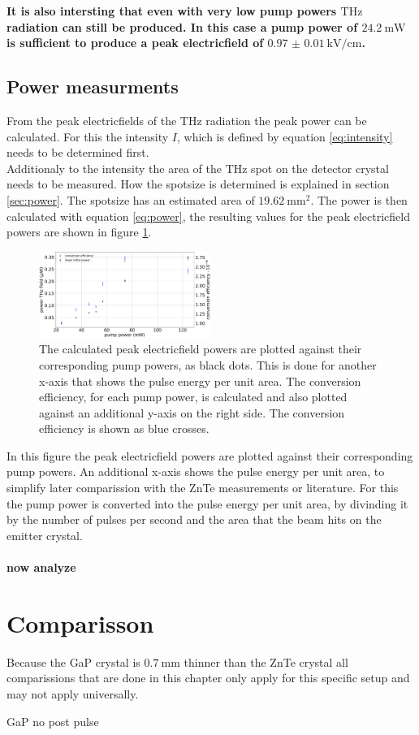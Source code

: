 \textbf{It is also intersting that even with very low pump powers $\si{\tera\hertz}$ radiation can still be produced.
In this case a pump power of $\SI{24.2}{\milli\W}$ is sufficient to produce a peak electricfield of $\SI{0.97(1)}{\kilo\V\per\centi\meter}$.}
\FloatBarrier
\subsection{Power measurments}
From the peak electricfields of the $\si{\tera\hertz}$ radiation the peak power can be calculated.
For this the intensity $I$, which is defined by equation \ref{eq:intensity} needs to be determined first.
\\
Additionaly to the intensity the area of the $\si{\tera\hertz}$ spot on the detector crystal needs to be measured.
How the spotsize is determined is explained in section \ref{sec:power}.
The spotsize has an estimated area of $\SI{19.62}{\milli\meter\squared}$.
The power is then calculated with equation \ref{eq:power}, the resulting values for the peak electricfield powers are shown in figure \ref{fig:gap_power}.
\begin{figure}
    \centering
    \includegraphics[width=0.5\textwidth]{Plots/Powergap.pdf}
    \caption{The calculated peak electricfield powers are plotted against their corresponding pump powers, as black dots.
    This is done for another x-axis that shows the pulse energy per unit area.
    The conversion efficiency, for each pump power, is calculated and also plotted against an additional y-axis on the right side.
    The conversion efficiency is shown as blue crosses.}
    \label{fig:gap_power}
\end{figure}
In this figure the peak electricfield powers are plotted against their corresponding pump powers.
An additional x-axis shows the pulse energy per unit area, to simplify later comparission with the ZnTe measurements or literature.
For this the pump power is converted into the pulse energy per unit area, by divinding it by the number of pulses per second and the area that the beam hits on the emitter crystal.
\\\\

\textbf{now analyze}


\FloatBarrier






\section{Comparisson}
Because the GaP crystal is $\SI{0.7}{\milli\meter}$ thinner than the ZnTe crystal all comparissions that are done in this chapter only apply for this specific setup and may not apply universally.


GaP no post pulse
